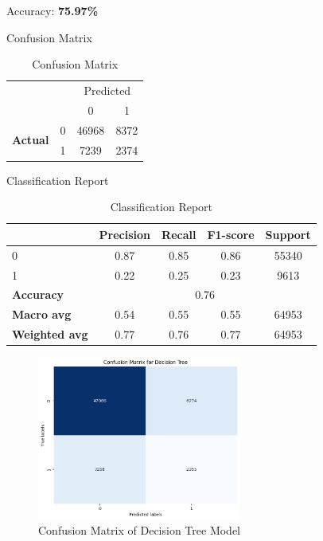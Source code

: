Accuracy: \textbf{75.97\%}

Confusion Matrix
\begin{table}[h]
    \centering
    \begin{tabular}{cc|c|c|}
        \toprule
        & & \multicolumn{2}{c}{Predicted} \\
        \cline{3-4}
        & & 0 & 1 \\
        \hline
        \multirow{2}{*}{\textbf{Actual}} & 0 & 46968 & 8372 \\
        & 1 & 7239 & 2374 \\
        \bottomrule
    \end{tabular}
    \caption{Confusion Matrix}
    \label{tab:confusion_matrix}
\end{table}

Classification Report
\begin{table}[h]
    \centering
    \begin{tabular}{lcccc}
        \toprule
        & \textbf{Precision} & \textbf{Recall} & \textbf{F1-score} & \textbf{Support} \\
        \midrule
        0 & 0.87 & 0.85 & 0.86 & 55340 \\
        1 & 0.22 & 0.25 & 0.23 & 9613 \\
        \midrule
        \textbf{Accuracy} & \multicolumn{4}{c}{0.76} \\
        \textbf{Macro avg} & 0.54 & 0.55 & 0.55 & 64953 \\
        \textbf{Weighted avg} & 0.77 & 0.76 & 0.77 & 64953 \\
        \bottomrule
    \end{tabular}
    \caption{Classification Report}
    \label{tab:classification_report}
\end{table}


\begin{figure}[h] 
    \centering 
    \includegraphics[width=0.6\textwidth]{media/decision_tree_conf_matr.png}
    \caption{Confusion Matrix of Decision Tree Model}

\end{figure}

